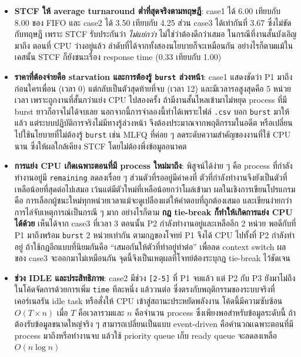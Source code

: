 \documentclass[a4paper,11pt]{article}
\newcommand{\code}[1]{\texttt{#1}}
\begin{document}
\begin{itemize}[leftmargin=*]
  \item \textbf{STCF ให้ average turnaround ต่ำที่สุดจริงตามทฤษฎี}: case1 ได้ 6.00
        เทียบกับ 8.00 ของ FIFO และ case2 ได้ 3.50 เทียบกับ 4.25 ส่วน case3
        ได้เท่ากันที่ 3.67 ซึ่งไม่ขัดกับทฤษฎี เพราะ STCF รับประกันว่า
        \emph{ไม่แย่กว่า} ไม่ใช่ว่าต้องดีกว่าเสมอ ในกรณีที่งานสั้นบังเอิญมาถึง
        ตอนที่ CPU ว่างอยู่แล้ว ลำดับที่ได้จากทั้งสองนโยบายก็จะเหมือนกัน
        อย่างไรก็ตามแม้ในเคสนั้น STCF ก็ยังชนะเรื่อง response time (0.33 เทียบกับ 1.00)

  \item \textbf{ราคาที่ต้องจ่ายคือ starvation และการต้องรู้ \code{burst} ล่วงหน้า}:
        case1 แสดงชัดว่า P1 มาถึงก่อนใครเพื่อน (เวลา 0) แต่กลับเป็นตัวสุดท้ายที่จบ
        (เวลา 12) และมีเวลารอสูงสุดคือ 5 หน่วยเวลา เพราะถูกงานที่สั้นกว่าแย่ง CPU
        ไปสองครั้ง ถ้ามีงานสั้นไหลเข้ามาไม่หยุด process ที่มี burst ยาวก็อาจไม่ได้จบเลย
        นอกจากนี้การจำลองนี้ทำได้เพราะไฟล์ \code{.csv} บอก \code{burst} มาให้แล้ว
        แต่ระบบปฏิบัติการจริงไม่มีทางรู้ล่วงหน้า จึงต้องประมาณจากพฤติกรรมในอดีต
        หรือเปลี่ยนไปใช้นโยบายที่ไม่ต้องรู้ \code{burst} เช่น MLFQ
        ที่ค่อย ๆ ลดระดับความสำคัญของงานที่ใช้ CPU นาน ซึ่งให้ผลใกล้เคียง STCF
        โดยไม่ต้องพึ่งข้อมูลอนาคต

  \item \textbf{การแย่ง CPU เกิดเฉพาะตอนที่มี process ใหม่มาถึง}: พิสูจน์ได้ง่าย ๆ
        คือ process ที่กำลังทำงานอยู่มี \code{remaining} ลดลงเรื่อย ๆ
        ส่วนตัวที่รออยู่มีค่าคงที่ ตัวที่กำลังทำงานจึงยังเป็นตัวที่เหลือน้อยที่สุดต่อไปเสมอ
        เว้นแต่มีตัวใหม่ที่เหลือน้อยกว่าโผล่เข้ามา ผลในเชิงการเขียนโปรแกรมคือ
        การเลือกผู้ชนะใหม่ทุกหน่วยเวลาแม้จะดูเปลืองแต่ให้คำตอบที่ถูกต้องเสมอ
        และเขียนง่ายกว่าการไล่จับเหตุการณ์เป็นกรณี ๆ มาก
        อย่างไรก็ตาม \textbf{กฎ tie-break ก็ทำให้เกิดการแย่ง CPU ได้ด้วย}
        เห็นได้จาก case3 ที่เวลา 3 ตอนนั้น P2 กำลังทำงานอยู่และเหลืออีก 2 หน่วย
        พอดีกับที่ P1 มาถึงพร้อม \code{burst} 2 หน่วยเท่ากัน ตามกฎของโจทย์
        P1 จึงได้ CPU ไปทั้งที่ P2 กำลังทำอยู่ ถ้าใช้กฎอีกแบบที่นิยมกันคือ
        ``เสมอกันให้ตัวที่ทำอยู่ทำต่อ'' เพื่อลด context switch ผลของ case3
        จะออกมาไม่เหมือนกัน จุดนี้จึงเป็นเหตุผลที่โจทย์ต้องระบุกฎ tie-break ไว้ชัดเจน

  \item \textbf{ช่วง IDLE และประสิทธิภาพ}: case2 มีช่วง \code{[2-5]} ที่ P1 จบแล้ว
        แต่ P2 กับ P3 ยังมาไม่ถึง ในโค้ดจัดการด้วยการเพิ่ม \code{time} ทีละหนึ่ง
        แล้ววนต่อ ซึ่งตรงกับพฤติกรรมของระบบจริงที่เคอร์เนลรัน idle task
        หรือสั่งให้ CPU เข้าสู่สถานะประหยัดพลังงาน โค้ดนี้มีความซับซ้อน
        $O(T \times n)$ เมื่อ $T$ คือเวลารวมและ $n$ คือจำนวน process
        ซึ่งเพียงพอสำหรับข้อมูลระดับนี้ ถ้าต้องรับข้อมูลขนาดใหญ่จริง ๆ
        สามารถเปลี่ยนเป็นแบบ event-driven คือคำนวณเฉพาะตอนที่มี process
        มาถึงหรือทำงานจบ แล้วใช้ priority queue เก็บ ready queue
        จะลดลงเหลือ $O(n \log n)$
\end{itemize}
\end{document}
